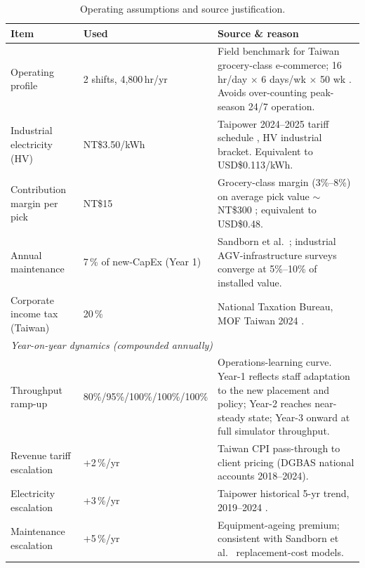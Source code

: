 \documentclass[conference]{IEEEtran}
\begin{document}
\begin{table}[t]
  \centering
  \caption{Operating assumptions and source justification.}
  \label{tab:fin_op_assumptions}
  \footnotesize
  \setlength{\tabcolsep}{3pt}
  \begin{tabular}{p{}p{}p{}}
    \toprule
    Item & Used & Source \& reason \\
    \midrule
    Operating profile
      & 2 shifts, 4{,}800\,hr/yr & Field benchmark for Taiwan grocery-class e-commerce; 16\,hr/day $\times$ 6 days/wk $\times$ 50 wk \cite{yu2008}. Avoids over-counting peak-season 24/7 operation. \\
    \addlinespace
    Industrial electricity (HV)
      & NT\$3.50/kWh & Taipower 2024--2025 tariff schedule \cite{taipower2024}, HV industrial bracket. Equivalent to USD\$0.113/kWh. \\
    \addlinespace
    Contribution margin per pick
      & NT\$15 & Grocery-class margin (3\%--8\%) on average pick value $\sim$ NT\$300 \cite{bartholdi2019,tompkins2010}; equivalent to USD\$0.48. \\
    \addlinespace
    Annual maintenance
      & 7\,\% of new-CapEx (Year 1) & Sandborn et al.~\cite{sandborn2019}; industrial AGV-infrastructure surveys converge at 5\%--10\% of installed value. \\
    \addlinespace
    Corporate income tax (Taiwan)
      & 20\,\% & National Taxation Bureau, MOF Taiwan 2024 \cite{taiwanmof}. \\
    \midrule
    \multicolumn{3}{l}{\emph{Year-on-year dynamics (compounded annually)}} \\
    Throughput ramp-up
      & 80\%/95\%/100\%/100\%/100\% & Operations-learning curve. Year-1 reflects staff adaptation to the new placement and policy; Year-2 reaches near-steady state; Year-3 onward at full simulator throughput. \\
    \addlinespace
    Revenue tariff escalation
      & +2\,\%/yr & Taiwan CPI pass-through to client pricing (DGBAS national accounts 2018--2024). \\
    \addlinespace
    Electricity escalation
      & +3\,\%/yr & Taipower historical 5-yr trend, 2019--2024 \cite{taipower2024}. \\
    \addlinespace
    Maintenance escalation
      & +5\,\%/yr & Equipment-ageing premium; consistent with Sandborn et al.~\cite{sandborn2019} replacement-cost models. \\
    \bottomrule
  \end{tabular}
\end{table}
\end{document}
